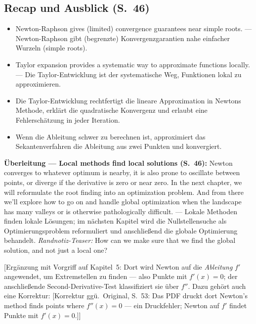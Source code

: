 \subsection{Recap und Ausblick (S.~46)}
\begin{itemize}[nosep]
  \item \glqq Newton-Raphson gives (limited) convergence guarantees near simple roots.\grqq{} — Newton-Raphson gibt (begrenzte) Konvergenzgarantien nahe einfacher Wurzeln (simple roots).
  \item \glqq Taylor expansion provides a systematic way to approximate functions locally.\grqq{} — Die Taylor-Entwicklung ist der systematische Weg, Funktionen lokal zu approximieren.
  \item Die Taylor-Entwicklung rechtfertigt die lineare Approximation in Newtons Methode, erklärt die quadratische Konvergenz und erlaubt eine Fehlerschätzung in jeder Iteration.
  \item Wenn die Ableitung schwer zu berechnen ist, approximiert das Sekantenverfahren die Ableitung aus zwei Punkten und konvergiert.
\end{itemize}
\textbf{Überleitung — Local methods find local solutions (S.~46):} \glqq Newton converges to whatever optimum is nearby, it is also prone to oscillate between points, or diverge if the derivative is zero or near zero. In the next chapter, we will reformulate the root finding into an optimization problem. And from there we'll explore how to go on and handle global optimization when the landscape has many valleys or is otherwise pathologically difficult.\grqq{} — Lokale Methoden finden lokale Lösungen; im nächsten Kapitel wird die Nullstellensuche als Optimierungsproblem reformuliert und anschließend die globale Optimierung behandelt. \emph{Randnotiz-Teaser:} \glqq How can we make sure that we find the global solution, and not just a local one?\grqq

[Ergänzung mit Vorgriff auf Kapitel~5: Dort wird Newton auf die \emph{Ableitung} $f'$ angewendet, um Extremstellen zu finden — also Punkte mit $f'(x) = 0$; der anschließende Second-Derivative-Test klassifiziert sie über $f''$. Dazu gehört auch eine Korrektur: {[Korrektur ggü.\ Original, S.~53: Das PDF druckt dort \glqq Newton's method finds points where $f''(x) = 0$\grqq{} — ein Druckfehler; Newton auf $f'$ findet Punkte mit $f'(x) = 0$.]}]

